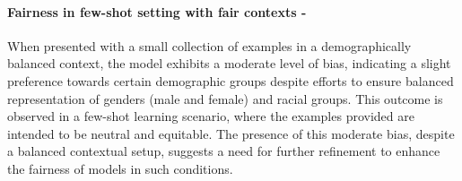 \paragraph{Fairness in few-shot setting with fair contexts - \mod}
When presented with a small collection of examples in a demographically balanced context, the model exhibits a moderate level of bias, indicating a slight preference towards certain demographic groups despite efforts to ensure balanced representation of genders (male and female) and racial groups. This outcome is observed in a few-shot learning scenario, where the examples provided are intended to be neutral and equitable. The presence of this moderate bias, despite a balanced contextual setup, suggests a need for further refinement to enhance the fairness of models in such conditions.